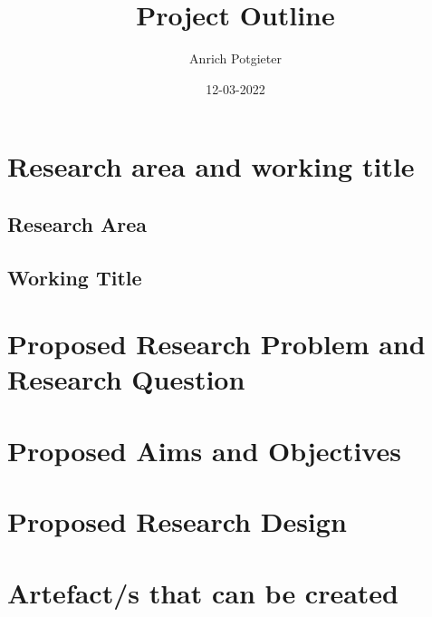 \documentclass[12pt]{article}
\title{Project Outline}
\author{Anrich Potgieter}
\date{12-03-2022}
\begin{document}
\maketitle
\section{Research area and working title}
\subsection{Research Area}
\subsection{Working Title}
\section{Proposed Research Problem and Research Question}
\section{Proposed Aims and Objectives}
\section{Proposed Research Design}
\section{Artefact/s that can be created}
\printbibliography
\end{document}
